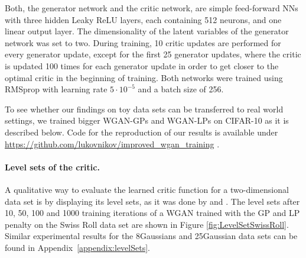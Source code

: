 \documentclass{article} %
\newcommand{\af}[1]{\textcolor{blue}{#1}}
\newcommand{\hp}[1]{\textcolor{red}{#1}}
\begin{document}
%
%
Both, the generator network and the critic network, are simple feed-forward NNs with three hidden Leaky ReLU layers, each containing 512 neurons, and one linear output layer. The dimensionality of the latent variables of the generator network was set to two.
%
During training, 10 critic updates are performed for every generator update, except for the first 25 generator updates, where the critic is updated 100 times for each generator update in order to get closer to the optimal critic in the beginning of training. Both networks were trained using RMSprop \citep{RmsProp} with learning rate $5\cdot10^{-5}$ and a batch size of 256. 

To see whether our findings on toy data sets can be transferred to real world settings, we trained bigger WGAN-GPs and WGAN-LPs on %
CIFAR-10 as it is described below. Code for the reproduction of our results is available under \url{https://github.com/lukovnikov/improved_wgan_training} .

\paragraph{Level sets of the critic.}
A qualitative way to evaluate the learned critic function for a two-dimensional data set is by displaying its level sets, as it was done by \citet{iWGAN} and \citet{DRAGAN}.
The level sets after 10, 50, 100 and 1000 training iterations of a WGAN trained with the GP and LP penalty on the
Swiss Roll data set 
are shown in Figure \ref{fig:LevelSetSwissRoll}. Similar experimental results for  the 8Gaussians and 25Gaussian data sets can be found in Appendix~\ref{appendix:levelSets}. 
\end{document}

